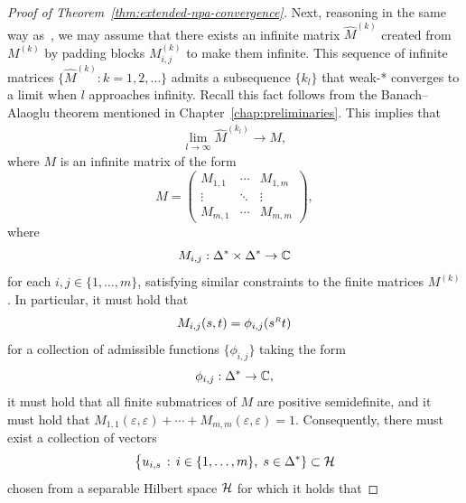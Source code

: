 \begin{proof}[Proof of Theorem~\ref{thm:extended-npa-convergence}]

  Next, reasoning in the same way as~\cite{Navascues2008}, we may assume that there exists an infinite matrix $\hat{M}^{(k)}$ created from $M^{(k)}$ by padding blocks $M_{i,j}^{(k)}$ to make them infinite. This sequence of infinite matrices $\{\hat{M}^{(k)} : k = 1,2,\ldots \}$ admits a subsequence $\{k_l\}$ that weak-* converges to a limit when $l$ approaches infinity. Recall this fact follows from the Banach--Alaoglu theorem mentioned in Chapter~\ref{chap:preliminaries}. This implies that 
  \begin{align}
  	\lim_{l \rightarrow \infty} \hat{M}^{(k_l)} \rightarrow M,
  \end{align}
where $M$ is an infinite matrix of the form
  \begin{equation}
    M
    = \begin{pmatrix}
      M_{1,1} & \cdots & M_{1,m}\\
      \vdots & \ddots & \vdots\\
      M_{m,1} & \cdots & M_{m,m}
    \end{pmatrix},
  \end{equation}
  where
  \begin{equation}
    M_{i,j} : \Delta^{\ast} \times \Delta^{\ast} \rightarrow \mathbb{C}
  \end{equation}
  for each $i,j\in\{1,\ldots,m\}$, satisfying similar constraints to the finite
  matrices $M^{(k)}$.
  In particular, it must hold that 
  \begin{equation}
    M_{i,j}(s,t) = \phi_{i,j}(s^{\mathsmaller{R}}t)
  \end{equation}
  for a collection of admissible functions $\{\phi_{i,j}\}$ taking the form
  \begin{equation}
    \phi_{i,j}:\Delta^{\ast} \rightarrow \mathbb{C},
  \end{equation}
  it must hold that all finite submatrices of $M$ are positive semidefinite,
  and it must hold that
  $M_{1,1}(\varepsilon,\varepsilon) + \cdots +
  M_{m,m}(\varepsilon,\varepsilon) = 1$.
  Consequently, there must exist a collection of vectors
  \begin{equation}
    \label{eq:vectors-in-H}
    \bigl\{u_{i,s}\,:\,i\in\{1,\ldots,m\},\;s\in\Delta^{\ast}\}\subset\mathcal{H}
  \end{equation}
  chosen from a separable Hilbert space $\mathcal{H}$ for which it holds that

\end{proof}
